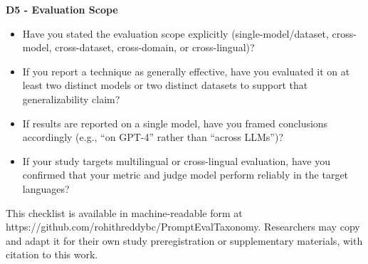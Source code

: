 \documentclass[journal]{IEEEtran}
\begin{document}
\textbf{D5 - Evaluation Scope}
\begin{itemize}
  \item Have you stated the evaluation scope explicitly
        (single-model/dataset, cross-model, cross-dataset, cross-domain,
        or cross-lingual)?
  \item If you report a technique as generally effective, have you
        evaluated it on at least two distinct models or two distinct
        datasets to support that generalizability claim?
  \item If results are reported on a single model, have you framed
        conclusions accordingly (e.g., ``on GPT-4'' rather than ``across
        LLMs'')?
  \item If your study targets multilingual or cross-lingual evaluation,
        have you confirmed that your metric and judge model perform
        reliably in the target languages?
\end{itemize}

This checklist is available in machine-readable form at
https://github.com/rohithreddybc/PromptEvalTaxonomy. Researchers may copy and adapt it for their
own study preregistration or supplementary materials, with citation to
this work.
\end{document}
